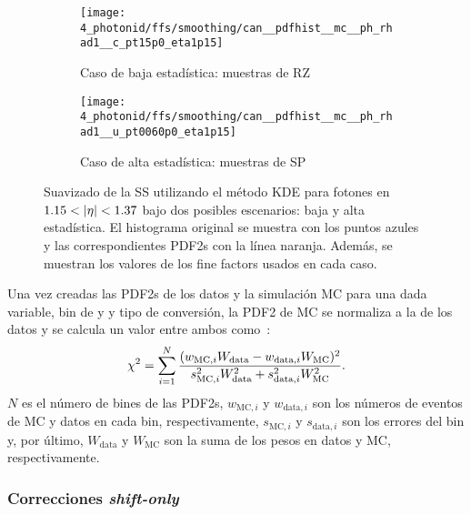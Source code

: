 \begin{figure}[ht!]
    \centering
    \begin{subfigure}[h]{0.49\linewidth}
        \centering
        \texttt{[image: 4\_photonid/ffs/smoothing/can\_\_pdfhist\_\_mc\_\_ph\_rhad1\_\_c\_pt15p0\_eta1p15]}
        \caption{Caso de baja estadística: muestras de \ac{RZ}}
    \end{subfigure}
    \hfill
    \begin{subfigure}[h]{0.49\linewidth}
        \centering
        \texttt{[image: 4\_photonid/ffs/smoothing/can\_\_pdfhist\_\_mc\_\_ph\_rhad1\_\_u\_pt0060p0\_eta1p15]}
        \caption{Caso de alta estadística: muestras de \ac{SP}}
    \end{subfigure}
    \caption{Suavizado de la \ac{SS} \rhad utilizando el método \ac{KDE} para fotones en \(1.15<\abseta<1.37\) bajo dos posibles escenarios: baja y alta estadística. El histograma original se muestra con los puntos azules y las correspondientes \acp{PDF2} con la línea naranja. Además, se muestran los valores de los fine factors usados en cada caso.}
    \label{fig:ss_corrections:ffs:calculation:smoothing_ss}
\end{figure}


Una vez creadas las \acp{PDF2} de los datos y la simulación \ac{MC} para una dada variable, bin de \pt y \abseta y tipo de conversión, la \ac{PDF2} de \ac{MC} se normaliza a la de los datos y se calcula un valor \chisq entre ambos como~\cite{Chi2Histograms}:
\begin{equation}
	\chi^{2} = \sum_{i=1}^{N} \dfrac{(w_{\text{MC},i} W_{\text{data}} - w_{\text{data},i} W_{\text{MC}})^2}{s_{\text{MC},i}^2 W_{\text{data}}^2 + s_{\text{data},i}^2 W_{\text{MC}}^2}.
\end{equation}
\(N\) es el número de bines de las \acp{PDF2}, \(w_{\text{MC},i}\) y \(w_{\text{data},i}\) son los números de eventos de \ac{MC} y datos en cada bin, respectivamente, \(s_{\text{MC},i}\) y \(s_{\text{data},i}\) son los errores del bin y, por último, \(W_{\text{data}}\) y \(W_{\text{MC}}\) son la suma de los pesos en datos y \ac{MC}, respectivamente.

\subsubsection{Correcciones \textit{shift-only}}

